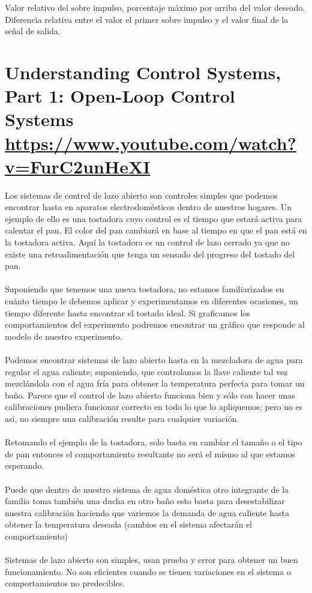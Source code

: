 \documentclass[
	12pt, %
]{fphw}
\begin{document}
Valor relativo del sobre impulso, porcentaje máximo por arriba del valor deseado. Diferencia relativa entre el valor el primer sobre impulso y el valor final de la señal de salida.\\


\newpage
\section*{{\color{Apricot}Understanding Control Systems, Part 1: Open-Loop Control Systems} \url{https://www.youtube.com/watch?v=FurC2unHeXI}}

Los sistemas de control de lazo abierto son controles simples que podemos encontrar hasta en aparatos electrodomésticos dentro de nuestros hogares. Un ejemplo de ello es una tostadora cuyo control es el tiempo que estará activa para calentar el pan. El color del pan cambiará en base al tiempo en que el pan está en la tostadora activa. Aquí la tostadora es un control de lazo cerrado ya que no existe una retroalimentación que tenga un sensado del progreso del tostado del pan. \\\\
Suponiendo que tenemos una nueva tostadora, no estamos familiarizados en cuánto tiempo le debemos aplicar y experimentamos en diferentes ocasiones, un tiempo diferente hasta encontrar el tostado ideal. Si graficamos los comportamientos del experimento podremos encontrar un gráfico que responde al modelo de nuestro experimento. \\\\
Podemos encontrar sistemas de lazo abierto hasta en la mezcladora de agua para regular el agua caliente; suponiendo, que controlamos la llave caliente tal vez mezclándola con el agua fría para obtener la temperatura perfecta para tomar un baño. Parece que el control de lazo abierto funciona bien y sólo con hacer unas calibraciones pudiera funcionar correcto en todo lo que lo apliquemos; pero no es así, no siempre una calibración resulte para cualquier variación. \\\\
Retomando el ejemplo de la tostadora, solo basta en cambiar el tamaño o el tipo de pan entonces el comportamiento resultante no será el mismo al que estamos esperando. \\\\
Puede que dentro de nuestro sistema de agua doméstica otro integrante de la familia toma también una ducha en otro baño esto basta para desestabilizar nuestra calibración haciendo que variemos la demanda de agua caliente hasta obtener la temperatura deseada (cambios en el sistema afectarán el comportamiento) \\\\
Sistemas de lazo abierto son simples, usan prueba y error para obtener un buen funcionamiento. No son eficientes cuando se tienen variaciones en el sistema o comportamientos no predecibles. \\
\end{document}
